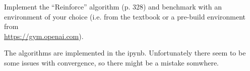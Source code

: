 
\begin{exercise}


Implement the \enquote{Reinforce} algorithm (p. 328) and benchmark with an environment of your choice (i.e. from the textbook or a pre-build environment from \\ \href{https://gym.openai.com}{https://gym.openai.com}).
\end{exercise}


\begin{solution}

The algorithms are implemented in the ipynb. Unfortunately there seem to be some issues with convergence, so there might be a mistake somwhere.

\end{solution}

